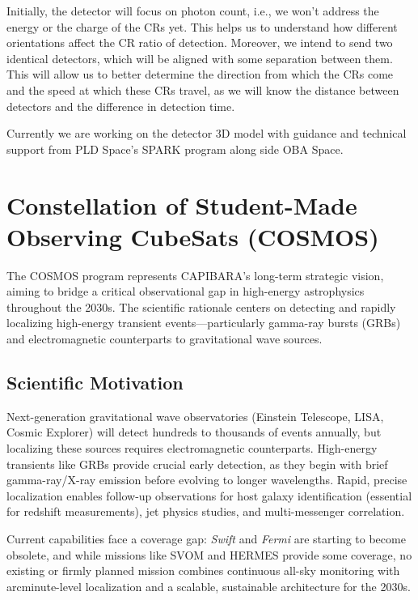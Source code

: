 \documentclass[11pt]{article}
\begin{document}
Initially, the detector will focus on photon count, i.e., we won’t address the energy or the charge of the CRs yet. This helps us to understand how different orientations affect the CR ratio of detection. Moreover, we intend to send two identical detectors, which will be aligned with some separation between them. This will allow us to better determine the direction from which the CRs come and the speed at which these CRs travel, as we will know the distance between detectors and the difference in detection time.  %

Currently we are working on the detector 3D model %
with guidance and technical support from PLD Space's SPARK program along side OBA Space.

\section{Constellation of Student-Made Observing CubeSats (COSMOS)}

The COSMOS program represents CAPIBARA's long-term strategic vision, aiming to bridge a critical observational gap in high-energy astrophysics throughout the 2030s. The scientific rationale centers on detecting and rapidly localizing high-energy transient events—particularly gamma-ray bursts (GRBs) and electromagnetic counterparts to gravitational wave sources.

\subsection*{Scientific Motivation}

Next-generation gravitational wave observatories (Einstein Telescope, LISA, Cosmic Explorer) will detect hundreds to thousands of events annually, but localizing these sources requires electromagnetic counterparts. High-energy transients like GRBs provide crucial early detection, as they begin with brief gamma-ray/X-ray emission before evolving to longer wavelengths. Rapid, precise localization enables follow-up observations for host galaxy identification (essential for redshift measurements), jet physics studies, and multi-messenger correlation.

Current capabilities face a coverage gap: \textit{Swift} and \textit{Fermi} are starting to become obsolete, and while missions like SVOM and HERMES provide some coverage, no existing or firmly planned mission combines continuous all-sky monitoring with arcminute-level localization and a scalable, sustainable architecture for the 2030s.
\end{document}
